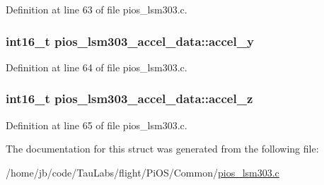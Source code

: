 \-Definition at line 63 of file pios\-\_\-lsm303.\-c.

\hypertarget{structpios__lsm303__accel__data_a7ffd1885ce614cf3163ee96ef56ace76}{
\subsubsection[{accel\-\_\-y}]{\setlength{\rightskip}{0pt plus 5cm}int16\-\_\-t {\bf pios\-\_\-lsm303\-\_\-accel\-\_\-data\-::accel\-\_\-y}}}\label{structpios__lsm303__accel__data_a7ffd1885ce614cf3163ee96ef56ace76}


\-Definition at line 64 of file pios\-\_\-lsm303.\-c.

\hypertarget{structpios__lsm303__accel__data_a426a988b03d546ea4036551041bf00d1}{
\subsubsection[{accel\-\_\-z}]{\setlength{\rightskip}{0pt plus 5cm}int16\-\_\-t {\bf pios\-\_\-lsm303\-\_\-accel\-\_\-data\-::accel\-\_\-z}}}\label{structpios__lsm303__accel__data_a426a988b03d546ea4036551041bf00d1}


\-Definition at line 65 of file pios\-\_\-lsm303.\-c.



\-The documentation for this struct was generated from the following file\-:\begin{DoxyCompactItemize}
\item 
/home/jb/code/\-Tau\-Labs/flight/\-Pi\-O\-S/\-Common/\hyperlink{pios__lsm303_8c}{pios\-\_\-lsm303.\-c}\end{DoxyCompactItemize}
